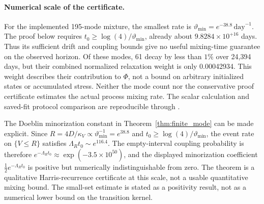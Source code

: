 \paragraph{Numerical scale of the certificate.}\label{par:stability-certificate}
For the implemented 195-mode mixture, the smallest rate is
$\vartheta_{\min}=e^{-38.8}\,\mathrm{day}^{-1}$. The proof below requires
$t_0\geq\log(4)/\vartheta_{\min}$, already about
$9.8284\times10^{+16}$ days. Thus its sufficient drift and coupling bounds
give no useful mixing-time guarantee on the observed horizon. Of these modes,
61 decay by less than $1\%$ over 24,394 days, but their combined normalized
relaxation weight is only 0.00042934. This weight describes their contribution
to $\Phi$, not a bound on arbitrary initialized states or accumulated stress.
Neither the mode count nor the conservative proof certificate estimates the
actual process mixing rate. The scalar calculation and saved-fit protocol
comparison are reproducible through
.

The Doeblin minorization constant in Theorem~\ref{thm:finite_mode} can be made
explicit. Since $R=4D/\kappa_V\propto\vartheta_{\min}^{-1}=e^{38.8}$ and
$t_0\geq\log(4)/\vartheta_{\min}$, the event rate on $\{V\leq R\}$ satisfies
$\Lambda_R t_0\sim e^{116.4}$. The empty-interval coupling probability is
therefore $e^{-\Lambda_R t_0}\approx\exp(-3.5\times10^{50})$, and the displayed
minorization coefficient $\tfrac12e^{-\Lambda_R t_0}$ is positive but
numerically indistinguishable from zero. The theorem is a qualitative
Harris-recurrence certificate at this scale, not a usable quantitative mixing
bound. The small-set estimate is stated as a positivity result, not as a
numerical lower bound on the transition kernel.


